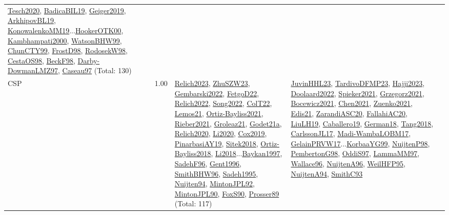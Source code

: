 {\begin{longtable}{p{3cm}r>{\raggedright\arraybackslash}p{6cm}>{\raggedright\arraybackslash}p{6cm}>{\raggedright\arraybackslash}p{8cm}}
\hyperref[detail:Tesch2020]{Tesch2020}, \hyperref[detail:BadicaBIL19]{BadicaBIL19}, \hyperref[detail:Geiger2019]{Geiger2019}, \hyperref[detail:ArkhipovBL19]{ArkhipovBL19}, \hyperref[detail:KonowalenkoMM19]{KonowalenkoMM19}...\hyperref[detail:HookerOTK00]{HookerOTK00}, \hyperref[detail:Kambhampati2000]{Kambhampati2000}, \hyperref[detail:WatsonBHW99]{WatsonBHW99}, \hyperref[detail:ChunCTY99]{ChunCTY99}, \hyperref[detail:FrostD98]{FrostD98}, \hyperref[detail:RodosekW98]{RodosekW98}, \hyperref[detail:CestaOS98]{CestaOS98}, \hyperref[detail:BeckF98]{BeckF98}, \hyperref[detail:Darby-DowmanLMZ97]{Darby-DowmanLMZ97}, \hyperref[detail:Caseau97]{Caseau97} (Total: 130)\\
\index{CSP}\index{CP!CSP}CSP &  1.00 & \hyperref[detail:Relich2023]{Relich2023}, \hyperref[detail:ZhuSZW23]{ZhuSZW23}, \hyperref[detail:Gembarski2022]{Gembarski2022}, \hyperref[detail:FetgoD22]{FetgoD22}, \hyperref[detail:Relich2022]{Relich2022}, \hyperref[detail:Song2022]{Song2022}, \hyperref[detail:ColT22]{ColT22}, \hyperref[detail:Lemos21]{Lemos21}, \hyperref[detail:Ortiz-Bayliss2021]{Ortiz-Bayliss2021}, \hyperref[detail:Rieber2021]{Rieber2021}, \hyperref[detail:Groleaz21]{Groleaz21}, \hyperref[detail:Godet21a]{Godet21a}, \hyperref[detail:Relich2020]{Relich2020}, \hyperref[detail:Li2020]{Li2020}, \hyperref[detail:Cox2019]{Cox2019}, \hyperref[detail:PinarbasiAY19]{PinarbasiAY19}, \hyperref[detail:Sitek2018]{Sitek2018}, \hyperref[detail:Ortiz-Bayliss2018]{Ortiz-Bayliss2018}, \hyperref[detail:Li2018]{Li2018}...\hyperref[detail:Baykan1997]{Baykan1997}, \hyperref[detail:SadehF96]{SadehF96}, \hyperref[detail:Gent1996]{Gent1996}, \hyperref[detail:SmithBHW96]{SmithBHW96}, \hyperref[detail:Sadeh1995]{Sadeh1995}, \hyperref[detail:Nuijten94]{Nuijten94}, \hyperref[detail:MintonJPL92]{MintonJPL92}, \hyperref[detail:MintonJPL90]{MintonJPL90}, \hyperref[detail:FoxS90]{FoxS90}, \hyperref[detail:Prosser89]{Prosser89} (Total: 117) & \hyperref[detail:JuvinHHL23]{JuvinHHL23}, \hyperref[detail:TardivoDFMP23]{TardivoDFMP23}, \hyperref[detail:Hajji2023]{Hajji2023}, \hyperref[detail:Doolaard2022]{Doolaard2022}, \hyperref[detail:Spieker2021]{Spieker2021}, \hyperref[detail:Grzegorz2021]{Grzegorz2021}, \hyperref[detail:Bocewicz2021]{Bocewicz2021}, \hyperref[detail:Chen2021]{Chen2021}, \hyperref[detail:Zuenko2021]{Zuenko2021}, \hyperref[detail:Edis21]{Edis21}, \hyperref[detail:ZarandiASC20]{ZarandiASC20}, \hyperref[detail:FallahiAC20]{FallahiAC20}, \hyperref[detail:LiuLH19]{LiuLH19}, \hyperref[detail:Caballero19]{Caballero19}, \hyperref[detail:German18]{German18}, \hyperref[detail:Tang2018]{Tang2018}, \hyperref[detail:CarlssonJL17]{CarlssonJL17}, \hyperref[detail:Madi-WambaLOBM17]{Madi-WambaLOBM17}, \hyperref[detail:GelainPRVW17]{GelainPRVW17}...\hyperref[detail:KorbaaYG99]{KorbaaYG99}, \hyperref[detail:NuijtenP98]{NuijtenP98}, \hyperref[detail:PembertonG98]{PembertonG98}, \hyperref[detail:OddiS97]{OddiS97}, \hyperref[detail:LammaMM97]{LammaMM97}, \hyperref[detail:Wallace96]{Wallace96}, \hyperref[detail:NuijtenA96]{NuijtenA96}, \hyperref[detail:WeilHFP95]{WeilHFP95}, \hyperref[detail:NuijtenA94]{NuijtenA94}, \hyperref[detail:SmithC93]{SmithC93} 
\end{longtable}}
